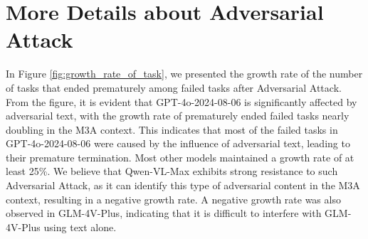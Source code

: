 \section{More Details about Adversarial Attack}
\label{appendix:Details about Adversarial Attack}
In Figure \ref{fig:growth_rate_of_task}, we presented the growth rate of the number of tasks that ended prematurely among failed tasks after Adversarial Attack. From the figure, it is evident that GPT-4o-2024-08-06 is significantly affected by adversarial text, with the growth rate of prematurely ended failed tasks nearly doubling in the M3A context. This indicates that most of the failed tasks in GPT-4o-2024-08-06 were caused by the influence of adversarial text, leading to their premature termination. Most other models maintained a growth rate of at least 25\%. We believe that Qwen-VL-Max exhibits strong resistance to such Adversarial Attack, as it can identify this type of adversarial content in the M3A context, resulting in a negative growth rate. A negative growth rate was also observed in GLM-4V-Plus, indicating that it is difficult to interfere with GLM-4V-Plus using text alone.







